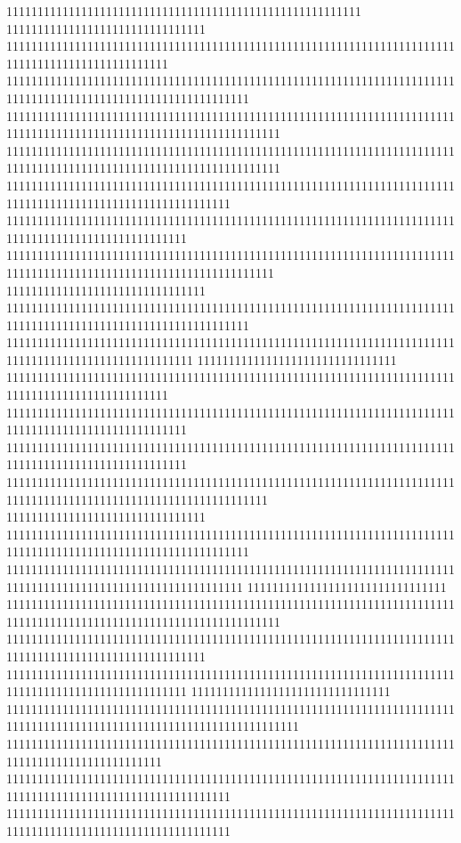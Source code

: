 111111111111111111111111111111111111111111111111111111111
11111111111111111111111111111111
11111111111111111111111111111111111111111111111111111111111111111111111111111111111111111111111111
111111111111111111111111111111111111111111111111111111111111111111111111111111111111111111111111111111111111111
11111111111111111111111111111111111111111111111111111111111111111111111111111111111111111111111111111111111111111111
11111111111111111111111111111111111111111111111111111111111111111111111111111111111111111111111111111111111111111111
111111111111111111111111111111111111111111111111111111111111111111111111111111111111111111111111111111111111
11111111111111111111111111111111111111111111111111111111111111111111111111111111111111111111111111111
1111111111111111111111111111111111111111111111111111111111111111111111111111111111111111111111111111111111111111111
11111111111111111111111111111111
111111111111111111111111111111111111111111111111111111111111111111111111111111111111111111111111111111111111111
111111111111111111111111111111111111111111111111111111111111111111111111111111111111111111111111111111
11111111111111111111111111111111
11111111111111111111111111111111111111111111111111111111111111111111111111111111111111111111111111
11111111111111111111111111111111111111111111111111111111111111111111111111111111111111111111111111111
11111111111111111111111111111111111111111111111111111111111111111111111111111111111111111111111111111
111111111111111111111111111111111111111111111111111111111111111111111111111111111111111111111111111111111111111111
11111111111111111111111111111111
111111111111111111111111111111111111111111111111111111111111111111111111111111111111111111111111111111111111111
11111111111111111111111111111111111111111111111111111111111111111111111111111111111111111111111111111111111111
11111111111111111111111111111111
11111111111111111111111111111111111111111111111111111111111111111111111111111111111111111111111111111111111111111111
11111111111111111111111111111111111111111111111111111111111111111111111111111111111111111111111111111111
11111111111111111111111111111111111111111111111111111111111111111111111111111111111111111111111111111
11111111111111111111111111111111
11111111111111111111111111111111111111111111111111111111111111111111111111111111111111111111111111111111111111111111111
1111111111111111111111111111111111111111111111111111111111111111111111111111111111111111111111111
111111111111111111111111111111111111111111111111111111111111111111111111111111111111111111111111111111111111
111111111111111111111111111111111111111111111111111111111111111111111111111111111111111111111111111111111111
